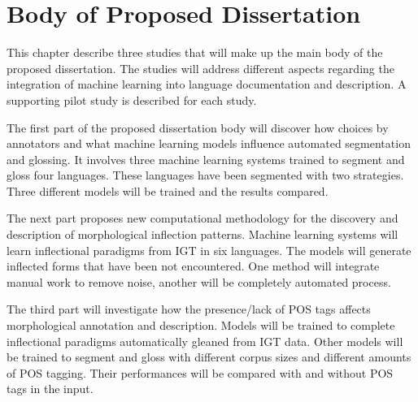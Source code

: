 \chapter{Body of Proposed Dissertation}
\label{chap:body}

This chapter describe three studies that will make up the main body of the proposed dissertation. The studies will address different aspects regarding the integration of machine learning into language documentation and description. %
A supporting pilot study is described for each study.

The first part of the proposed dissertation body will discover how choices by annotators and what machine learning models influence automated segmentation and glossing. It involves three machine learning systems trained to segment and gloss four languages. These languages have been segmented with two strategies. Three different models will be trained and the results compared.  


The next part proposes new computational methodology for the discovery and description of morphological inflection patterns. Machine learning systems will learn inflectional paradigms from IGT in six languages. The models will generate inflected forms that have been not encountered. One method will integrate manual work to remove noise, another will be completely automated process. 

The third part will investigate how the presence/lack of POS tags affects morphological annotation and description. Models will be trained to complete inflectional paradigms automatically gleaned from IGT data. Other models will be trained to segment and gloss with different corpus sizes and different amounts of POS tagging. Their performances will be compared with and without POS tags in the input.


\newpage

%
\newpage

\newpage

